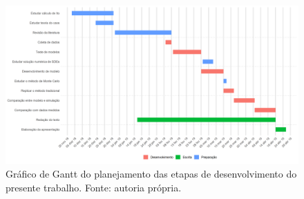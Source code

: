 \documentclass[
	12pt,				%
	openright,			%
	oneside,			%
	a4paper,			%
	english,			%
	french,				%
	spanish,			%
	brazil				%
	]{abntex2}
\begin{document}
\begin{figure}[h]
	\hspace*{-2.5cm}   
    \includegraphics[scale=0.65]{gantt}
    \caption{Gráfico de Gantt do planejamento das etapas de desenvolvimento do presente trabalho. Fonte: autoria própria.}
    \centering
\end{figure}


\end{document}
